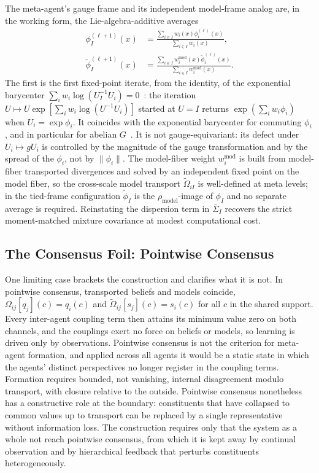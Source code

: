 \documentclass[11pt]{article}
\begin{document}
The meta-agent's gauge frame and its independent model-frame analog are, in the working form, the Lie-algebra-additive averages
\begin{equation}
\begin{aligned}
\phi_I^{(\ell+1)}(x)
&= \frac{\sum_{i \in I} w_i(x)\phi_i^{(\ell)}(x)}{\sum_{i \in I} w_i(x)}, \\
\tilde\phi_I^{(\ell+1)}(x)
&= \frac{\sum_{i \in I} w_i^{\mathrm{mod}}(x)\tilde\phi_i^{(\ell)}(x)}{\sum_{i \in I} w_i^{\mathrm{mod}}(x)}.
\end{aligned}
\end{equation}
The first is the first fixed-point iterate, from the identity, of the exponential barycenter $\sum_i w_i\log(U_I^{-1}U_i) = 0$~\cite{PennecArsigny2013}: the iteration $U \mapsto U\exp[\sum_i w_i \log(U^{-1}U_i)]$ started at $U = I$ returns $\exp(\sum_i w_i \phi_i)$ when $U_i = \exp\phi_i$. It coincides with the exponential barycenter for commuting $\phi_i$, and in particular for abelian $G$~\cite{Hall2015}. It is not gauge-equivariant: its defect under $U_i \mapsto gU_i$ is controlled by the magnitude of the gauge transformation and by the spread of the $\phi_i$, not by $\|\phi_i\|$. The model-fiber weight $w^{\mathrm{mod}}_i$ is built from model-fiber transported divergences and solved by an independent fixed point on the model fiber, so the cross-scale model transport $\tilde\Omega_{iI}$ is well-defined at meta levels; in the tied-frame configuration $\tilde\phi_I$ is the $\rho_{\mathrm{model}}$-image of $\phi_I$ and no separate average is required. Reinstating the dispersion term in $\bar{\Sigma}_I$ recovers the strict moment-matched mixture covariance at modest computational cost.

\subsection{The Consensus Foil: Pointwise Consensus}
\label{sec:epistemic_collapse}

One limiting case brackets the construction and clarifies what it is not. In pointwise consensus, transported beliefs and models coincide, $\Omega_{ij}[q_j](c) = q_i(c)$ and $\tilde{\Omega}_{ij}[s_j](c) = s_i(c)$ for all $c$ in the shared support. Every inter-agent coupling term then attains its minimum value zero on both channels, and the couplings exert no force on beliefs or models, so learning is driven only by observations. Pointwise consensus is not the criterion for meta-agent formation, and applied across all agents it would be a static state in which the agents' distinct perspectives no longer register in the coupling terms. Formation requires bounded, not vanishing, internal disagreement modulo transport, with closure relative to the outside. Pointwise consensus nonetheless has a constructive role at the boundary: constituents that have collapsed to common values up to transport can be replaced by a single representative without information loss. The construction requires only that the system as a whole not reach pointwise consensus, from which it is kept away by continual observation and by hierarchical feedback that perturbs constituents heterogeneously.
\end{document}
